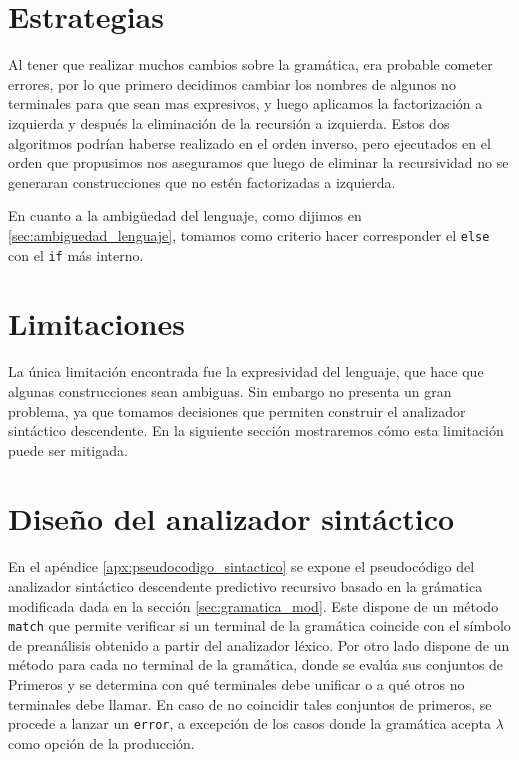 \section{Estrategias}
Al tener que realizar muchos cambios sobre la gramática, era probable cometer errores, por lo que primero decidimos cambiar los nombres de algunos no terminales para que sean mas expresivos, y luego aplicamos la factorización a izquierda y después la eliminación de la recursión a izquierda. Estos dos algoritmos podrían haberse realizado en el orden inverso, pero ejecutados en el orden que propusimos nos aseguramos que luego de eliminar la recursividad no se generaran construcciones que no estén factorizadas a izquierda. 

En cuanto a la ambigüedad del lenguaje, como dijimos en \ref{sec:ambiguedad_lenguaje}, tomamos como criterio hacer corresponder el \texttt{else} con el \texttt{if} más interno. 

\section{Limitaciones}
La única limitación encontrada fue la expresividad del lenguaje, que hace que algunas construcciones sean ambiguas. Sin embargo no presenta un gran problema, ya que tomamos decisiones que permiten construir el analizador sintáctico descendente. En la siguiente sección mostraremos cómo esta limitación puede ser mitigada.

\section{Diseño del analizador sintáctico}
\label{sec:diseno_sintactico}
En el apéndice \ref{apx:pseudocodigo_sintactico} se expone el pseudocódigo del analizador sintáctico descendente predictivo recursivo basado en la grámatica modificada dada en la sección \ref{sec:gramatica_mod}. Este dispone de un método \texttt{match} que permite verificar si un terminal de la gramática coincide con el símbolo de preanálisis obtenido a partir del analizador léxico. Por otro lado dispone de un método para cada no terminal de la gramática, donde se evalúa sus conjuntos de Primeros y se determina con qué terminales debe unificar o a qué otros no terminales debe llamar. En caso de no coincidir tales conjuntos de primeros, se procede a lanzar un \texttt{error}, a excepción de los casos donde la gramática acepta $\lambda$ como opción de la producción.


